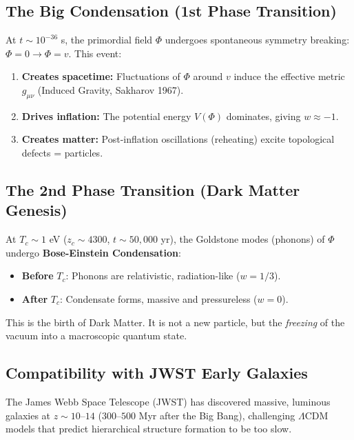 \documentclass[a4paper,12pt]{article}
\begin{document}
\subsection{The Big Condensation (1st Phase Transition)}
At $t \sim 10^{-36}$ s, the primordial field $\Phi$ undergoes spontaneous symmetry breaking: $\Phi = 0 \to \Phi = v$. This event:
\begin{enumerate}
    \item \textbf{Creates spacetime:} Fluctuations of $\Phi$ around $v$ induce the effective metric $g_{\mu\nu}$ (Induced Gravity, Sakharov 1967).
    \item \textbf{Drives inflation:} The potential energy $V(\Phi)$ dominates, giving $w \approx -1$.
    \item \textbf{Creates matter:} Post-inflation oscillations (reheating) excite topological defects = particles.
\end{enumerate}

\subsection{The 2nd Phase Transition (Dark Matter Genesis)}
At $T_c \sim 1$ eV ($z_c \sim 4300$, $t \sim 50{,}000$ yr), the Goldstone modes (phonons) of $\Phi$ undergo \textbf{Bose-Einstein Condensation}:
\begin{itemize}
    \item \textbf{Before} $T_c$: Phonons are relativistic, radiation-like ($w = 1/3$).
    \item \textbf{After} $T_c$: Condensate forms, massive and pressureless ($w = 0$).
\end{itemize}
This is the birth of Dark Matter. It is not a new particle, but the \textit{freezing} of the vacuum into a macroscopic quantum state.

\subsection{Compatibility with JWST Early Galaxies}
The James Webb Space Telescope (JWST) has discovered massive, luminous galaxies at $z \sim 10$--$14$ ($300$--$500$ Myr after the Big Bang), challenging $\Lambda$CDM models that predict hierarchical structure formation to be too slow.
\end{document}
